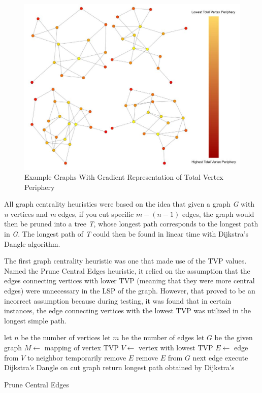 \documentclass[twocolumn,showpacs,%
  nofootinbib,aps,superscriptaddress,%
  eqsecnum,prd,notitlepage,showkeys,11pt]{article}
\begin{document}
\begin{figure}
    \centering
    \includegraphics[width=0.8\linewidth]{GraphTVPGradientsExamples.jpg}
    \caption{Example Graphs With Gradient Representation of Total Vertex Periphery}
    \label{fig:GraphTVPGradient}
\end{figure}

All graph centrality heuristics were based on the idea that given a graph \textit{G} with \textit{n} vertices and \textit{m} edges, if you cut specific \(m - (n - 1)\) edges, the graph would then be pruned into a tree \textit{T}, whose longest path corresponds to the longest path in \textit{G}. The longest path of \textit{T} could then be found in linear time with Dijkstra's Dangle algorithm.

The first graph centrality heuristic was one that made use of the TVP values. Named the Prune Central Edges heuristic, it relied on the assumption that the edges connecting vertices with lower TVP (meaning that they were more central edges) were unnecessary in the LSP of the graph. However, that proved to be an incorrect assumption because during testing, it was found that in certain instances, the edge connecting vertices with the lowest TVP was utilized in the longest simple path.

\begin{algorithm}
\begin{algorithmic}

\State let $n$ be the number of vertices 
\State let $m$ be the number of edges
\State let $G$ be the given graph
\State{}
    \State $M \gets$ mapping of vertex TVP
    \State $V \gets$ vertex with lowest TVP
        \State $E \gets$ edge from $V$ to neighbor
        \State temporarily remove $E$
            \State remove $E$ from $G$
        \Else
            \State next edge
        \EndIf
    \EndFor
\EndFor
\State{}
\State execute Dijkstra's Dangle on cut graph
\State return longest path obtained by Dijkstra's
\end{algorithmic}
\caption{Prune Central Edges}\label{alg:PruneCentralEdges}
\end{algorithm}
\end{document}
